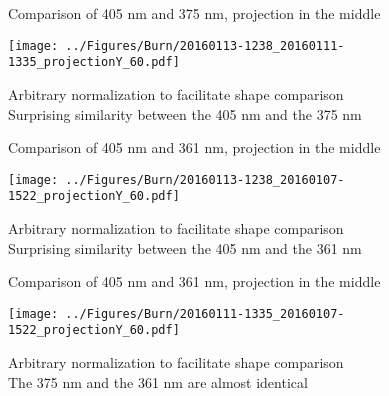 \documentclass[compress,8pt]{beamer} %
\begin{document}
\begin{frame}{Comparison of 405 nm and 375 nm, projection in the middle}
\begin{adjustwidth}{-3em}{-3em}
\begin{center}
\texttt{[image: ../Figures/Burn/20160113-1238\_20160111-1335\_projectionY\_60.pdf]}
\end{center}
\end{adjustwidth}
Arbitrary normalization to facilitate shape comparison \\
Surprising similarity between the 405 nm and the 375 nm \\
\end{frame}



\begin{frame}{Comparison of 405 nm and 361 nm, projection in the middle}
\begin{adjustwidth}{-3em}{-3em}
\begin{center}
\texttt{[image: ../Figures/Burn/20160113-1238\_20160107-1522\_projectionY\_60.pdf]}
\end{center}
\end{adjustwidth}
Arbitrary normalization to facilitate shape comparison \\
Surprising similarity between the 405 nm and the 361 nm \\
\end{frame}



\begin{frame}{Comparison of 405 nm and 361 nm, projection in the middle}
\begin{adjustwidth}{-3em}{-3em}
\begin{center}
\texttt{[image: ../Figures/Burn/20160111-1335\_20160107-1522\_projectionY\_60.pdf]}
\end{center}
\end{adjustwidth}
Arbitrary normalization to facilitate shape comparison \\
The 375 nm and the 361 nm are almost identical \\
\end{frame}



\end{document}
